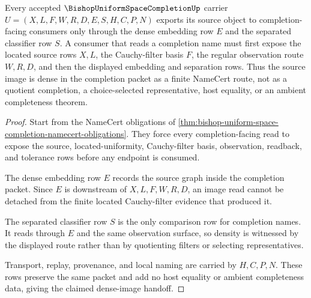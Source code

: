 \begin{theorem}
\label{thm:bishop-uniform-space-completion-dense-image}
Every accepted $\BishopUniformSpaceCompletionUp$ carrier $U=(X,L,F,W,R,D,E,S,H,C,P,N)$ exports its source object to completion-facing consumers only through the dense embedding row $E$ and the separated classifier row $S$. A consumer that reads a completion name must first expose the located source rows $X,L$, the Cauchy-filter basis $F$, the regular observation route $W,R,D$, and then the displayed embedding and separation rows. Thus the source image is dense in the completion packet as a finite NameCert route, not as a quotient completion, a choice-selected representative, host equality, or an ambient completeness theorem.
\end{theorem}
\begin{proof}
Start from the NameCert obligations of \autoref{thm:bishop-uniform-space-completion-namecert-obligations}. They force every completion-facing read to expose the source, located-uniformity, Cauchy-filter basis, observation, readback, and tolerance rows before any endpoint is consumed.

The dense embedding row $E$ records the source graph inside the completion packet. Since $E$ is downstream of $X,L,F,W,R,D$, an image read cannot be detached from the finite located Cauchy-filter evidence that produced it.

The separated classifier row $S$ is the only comparison row for completion names. It reads through $E$ and the same observation surface, so density is witnessed by the displayed route rather than by quotienting filters or selecting representatives.

Transport, replay, provenance, and local naming are carried by $H,C,P,N$. These rows preserve the same packet and add no host equality or ambient completeness data, giving the claimed dense-image handoff.
\end{proof}



